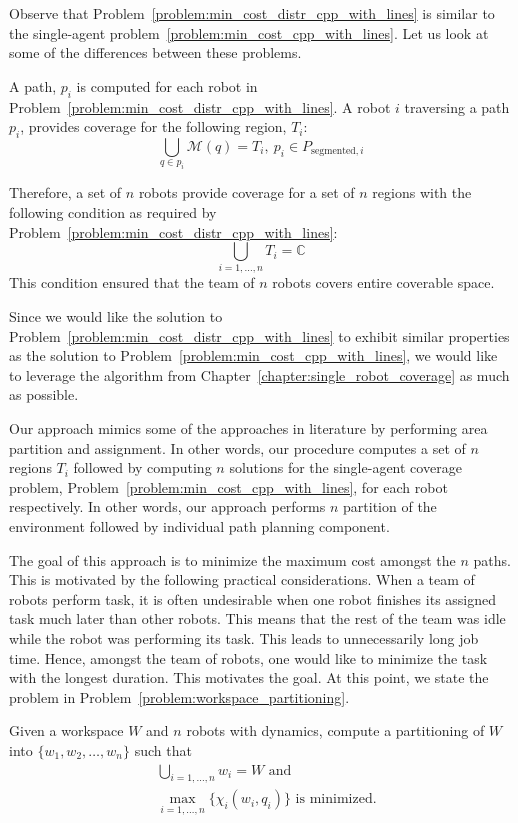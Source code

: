 \documentclass[../main.tex]{subfiles}
\begin{document}
Observe that Problem~\ref{problem:min_cost_distr_cpp_with_lines} is similar to the single-agent problem~\ref{problem:min_cost_cpp_with_lines}. Let us look at some of the differences between these problems.

A path, $p_i$ is computed for each robot in Problem~\ref{problem:min_cost_distr_cpp_with_lines}. A robot $i$ traversing a path $p_i$, provides coverage for the following region, $T_i$:
\begin{equation}
	\bigcup_{q\in p_i}\mathcal{M}(q) = T_i,\ p_i\in P_{\text{segmented},i}
\end{equation}

Therefore, a set of $n$ robots provide coverage for a set of $n$ regions with the following condition as required by Problem~\ref{problem:min_cost_distr_cpp_with_lines}:
\begin{equation}
	\bigcup_{i=1,\ldots,n}T_i=\mathbb{C}
\end{equation}
This condition ensured that the team of $n$ robots covers entire coverable space.

Since we would like the solution to Problem~\ref{problem:min_cost_distr_cpp_with_lines} to exhibit similar properties as the solution to Problem~\ref{problem:min_cost_cpp_with_lines}, we would like to leverage the algorithm from Chapter~\ref{chapter:single_robot_coverage} as much as possible.

Our approach mimics some of the approaches in literature by performing area partition and assignment. In other words, our procedure computes a set of $n$ regions $T_i$ followed by computing $n$ solutions for the single-agent coverage problem, Problem~\ref{problem:min_cost_cpp_with_lines}, for each robot respectively. In other words, our approach performs $n$ partition of the environment followed by individual path planning component.

The goal of this approach is to minimize the maximum cost amongst the $n$ paths. This is motivated by the following practical considerations. When a team of robots perform task, it is often undesirable when one robot finishes its assigned task much later than other robots. This means that the rest of the team was idle while the robot was performing its task. This leads to unnecessarily long job time. Hence, amongst the team of robots, one would like to minimize the task with the longest duration. This motivates the goal. At this point, we state the problem in Problem~\ref{problem:workspace_partitioning}.

\begin{problem}
\label{problem:workspace_partitioning}
	Given a workspace $W$ and $n$ robots with dynamics, compute a partitioning of $W$ into $\{w_1,w_2,\dots,w_n\}$ such that
	\begin{equation}
	\begin{aligned}
		& \bigcup_{i=1,\dots,n}w_i=W\text{ and}\\
		& \max_{i=1,\ldots,n}\{\chi_i(w_i,q_i)\}\text{ is minimized.}
	\end{aligned}
	\end{equation}
\end{problem}
\end{document}
